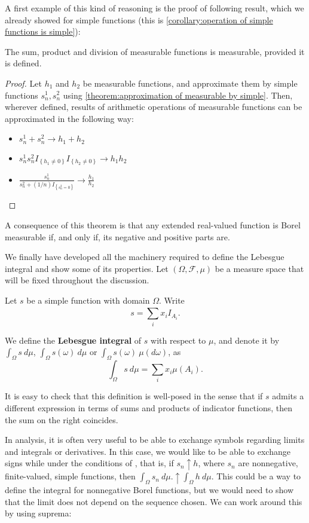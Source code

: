 A first example of this kind of reasoning is the proof of following result, which we already showed for simple functions (this is \cref{corollary:operation of simple functions is simple}):

\begin{prop} The sum, product and division of measurable functions is
measurable, provided it is defined.
\end{prop}
\begin{proof} Let \(h_1\) and \(h_2\) be measurable functions, and approximate
them by simple functions \(s_n^1, s_n^2\) using \cref{theorem:approximation of
measurable by simple}. Then, wherever defined, results of arithmetic operations of measurable functions can be approximated in the following way:
	\begin{itemize}
		\item \(s_n^1+s_n^2\to h_1+h_2\)
		\item
\(s_n^1s_n^2I_{\left\{h_1\neq0\right\}}I_{\left\{h_2\neq0\right\}}\to h_1h_2\)
		\item
\(\displaystyle \frac{s_n^1}{s_n^2+(1/n)I_{\left\{s_n^2=0\right\}}}\to \frac{h_1}{h_2}\)
	\end{itemize}
\end{proof}
\begin{remk} A consequence of this theorem is that any extended real-valued
function is Borel measurable if, and only if, its negative and positive parts
are.
\end{remk}
We finally have developed all the machinery required to define the Lebesgue integral
and show some of its properties. Let \(\left(\Omega,\mathcal{F},\mu\right)\) be a measure
space that will be fixed throughout the discussion.

\begin{defn} Let \(s\) be a simple function with domain \(\Omega\). Write
	\[s=\sum_{i}^{}x_iI_{A_i}.\]
	
	We define the \textbf{Lebesgue integral} of \(s\) with respect to \(\mu\), and denote it by
\(\int_{\Omega}s ~d\mu\), \(\int_{\Omega}s(\omega)~d\mu\) or
\(\int_{\Omega}s(\omega)~\mu(d\omega)\), as
	\[\int_{\Omega}s~d\mu=\sum_{i}^{}x_i\mu(A_i).\]
\end{defn}
It is easy to check that this definition is well-posed in the sense that if
\(s\) admits a different expression in terms of sums and products of indicator
functions, then the sum on the right coincides.

In analysis, it is often very useful to be able to exchange symbols regarding limits and integrals or derivatives. In this case, we would
like to be able to exchange signs while under the conditions of
, that is, if
\(s_n\uparrow h\), where \(s_n\) are nonnegative, finite-valued, simple
functions, then \(\int_\Omega s_n~d\mu.\uparrow\int_\Omega h~d\mu\). This could
be a way to define the integral for nonnegative Borel functions, but we would
need to show that the limit does not depend on the sequence chosen. We can work
around this by using suprema:

